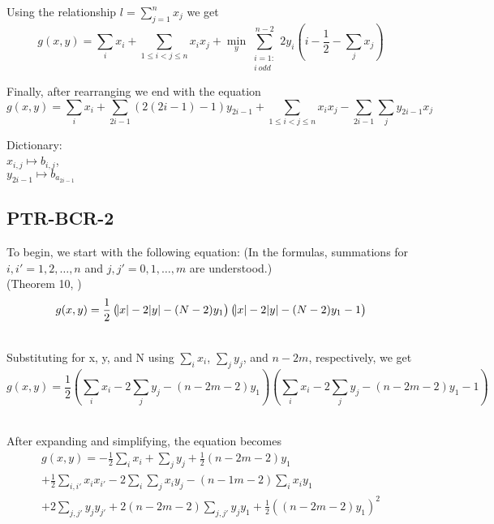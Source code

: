 \documentclass[english,notitlepage,longbibliography,showpacs,preprintnumbers,amsmath,amssymb,aps,prx,nofootinbib,12pt,superscriptaddress]{revtex4-1}
\begin{document}
\noindent Using the relationship $l = \sum_{j=1}^n x_j$ we get
\begin{equation}
  g(x,y) = \sum_i x_i + \sum_{1\leq i<j\leq n}x_ix_j + \min_y\sum_{\substack{i = 1:\\ i\:odd}}^{n-2}2y_i\left(i-\frac{1}{2}-\sum_j x_j\right)
\end{equation}

\noindent Finally, after rearranging we end with the equation
\begin{equation}
  g(x,y) = \sum_i x_i + \sum_{2i - 1}\left(2(2i - 1)-1\right)y_{2i - 1} + \sum_{1\leq i<j\leq n}x_ix_j - \sum_{2i - 1}\sum_jy_{2i - 1} x_j
\end{equation}

\noindent Dictionary:\\
$x_{i,j}\mapsto b_{i,j}$,\\
$y_{2i-1}\mapsto b_{a_{2i-1}}$\\


\subsection{PTR-BCR-2}

To begin, we start with the following equation: (In the formulas, summations for $i,i' = 1,2,\dots,n$ and $j,j' = 0,1,\dots,m$ are understood.)\\
(Theorem 10, \cite{Boros2018boundsPaper})
\begin{equation}
  g(x,y) = \frac{1}{2}\left(\abs{x} - 2\abs{y} - (N - 2)y_1\right)\left(\abs{x} - 2\abs{y} - (N - 2)y_1 - 1\right)
\end{equation}

\noindent \\Substituting for x, y, and N using $\sum_i x_i$, $\sum_j y_j$, and $n - 2m$, respectively, we get
\begin{equation}
  g(x,y) = \frac{1}{2}\left(\sum_i x_i - 2\sum_j y_j - (n - 2m - 2)y_1\right)\left(\sum_i x_i - 2\sum_j y_j - (n - 2m - 2)y_1 - 1\right)
\end{equation}

\noindent \\After expanding and simplifying, the equation becomes
\begin{equation}
\begin{split}
  \left.
  g(x,y)
  \right.
  = -\frac{1}{2}\sum_i x_i + \sum_j y_j + \frac{1}{2}\left(n-2m-2\right)y_1\\
  + \frac{1}{2}\sum_{i,i'}x_i x_{i'} -2\sum_i \sum_j x_i y_j -\left(n-1m-2\right)\sum_i x_i y_{1}\\
  + 2\sum_{j,j'} y_j y_{j'} + 2\left(n-2m-2\right)\sum_{j,j'} y_j y_{1} + \frac{1}{2}\left((n-2m-2)y_1\right)^2
\end{split}
\end{equation}
\end{document}
